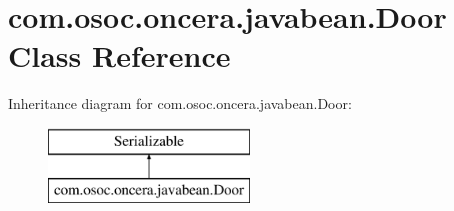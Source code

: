 \hypertarget{classcom_1_1osoc_1_1oncera_1_1javabean_1_1_door}{}\section{com.\+osoc.\+oncera.\+javabean.\+Door Class Reference}
\label{classcom_1_1osoc_1_1oncera_1_1javabean_1_1_door}
Inheritance diagram for com.\+osoc.\+oncera.\+javabean.\+Door\+:\begin{figure}[H]
\begin{center}
\leavevmode
\includegraphics[height=2.000000cm]{classcom_1_1osoc_1_1oncera_1_1javabean_1_1_door}
\end{center}
\end{figure}
